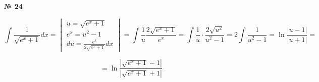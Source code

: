 \documentclass{article}
\begin{document}
\textbf{№ 24} 

$$ \int \frac{1}{\sqrt{e^x+1}} dx 
= \begin{vmatrix} u = \sqrt{e^x+1} \\
                  e^x = u^2-1 \\
                  du = \frac{e^x}{2\sqrt{e^x+1}}dx \end{vmatrix} 
= \int \frac{1}{u} \frac{2\sqrt{e^x+1}}{e^x} 
= \int \frac{1}{u} \cdot \frac{2\sqrt{u^2}}{u^2-1}
= 2 \int \frac{1}{u^2-1}
= \ln{\frac{\left| u-1 \right|}{\left| u+1 \right|}} 
= $$

$$ = \ln{\frac{\left| \sqrt{e^x+1}-1 \right|}{\left| \sqrt{e^x+1}+1 \right|}} $$
\end{document}
